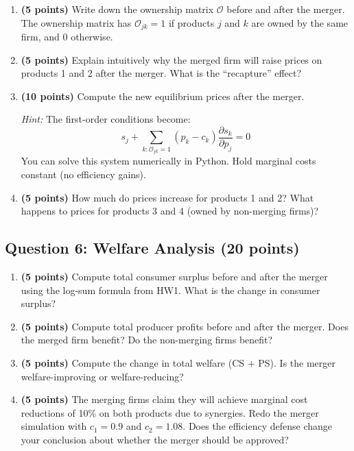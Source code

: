 \documentclass[11pt]{article}
\begin{document}
\begin{enumerate}
\item \textbf{(5 points)} Write down the ownership matrix $\mathcal{O}$ before and after the merger. The ownership matrix has $\mathcal{O}_{jk} = 1$ if products $j$ and $k$ are owned by the same firm, and 0 otherwise.

\item \textbf{(5 points)} Explain intuitively why the merged firm will raise prices on products 1 and 2 after the merger. What is the ``recapture'' effect?

\item \textbf{(10 points)} Compute the new equilibrium prices after the merger.

\textit{Hint:} The first-order conditions become:
\[
s_j + \sum_{k: \mathcal{O}_{jk}=1} (p_k - c_k) \frac{\partial s_k}{\partial p_j} = 0
\]
You can solve this system numerically in Python. Hold marginal costs constant (no efficiency gains).

\item \textbf{(5 points)} How much do prices increase for products 1 and 2? What happens to prices for products 3 and 4 (owned by non-merging firms)?
\end{enumerate}

\subsection*{Question 6: Welfare Analysis (20 points)}

\begin{enumerate}
\item \textbf{(5 points)} Compute total consumer surplus before and after the merger using the log-sum formula from HW1. What is the change in consumer surplus?

\item \textbf{(5 points)} Compute total producer profits before and after the merger. Does the merged firm benefit? Do the non-merging firms benefit?

\item \textbf{(5 points)} Compute the change in total welfare (CS + PS). Is the merger welfare-improving or welfare-reducing?

\item \textbf{(5 points)} The merging firms claim they will achieve marginal cost reductions of 10\% on both products due to synergies. Redo the merger simulation with $c_1 = 0.9$ and $c_2 = 1.08$. Does the efficiency defense change your conclusion about whether the merger should be approved?
\end{enumerate}
\end{document}
